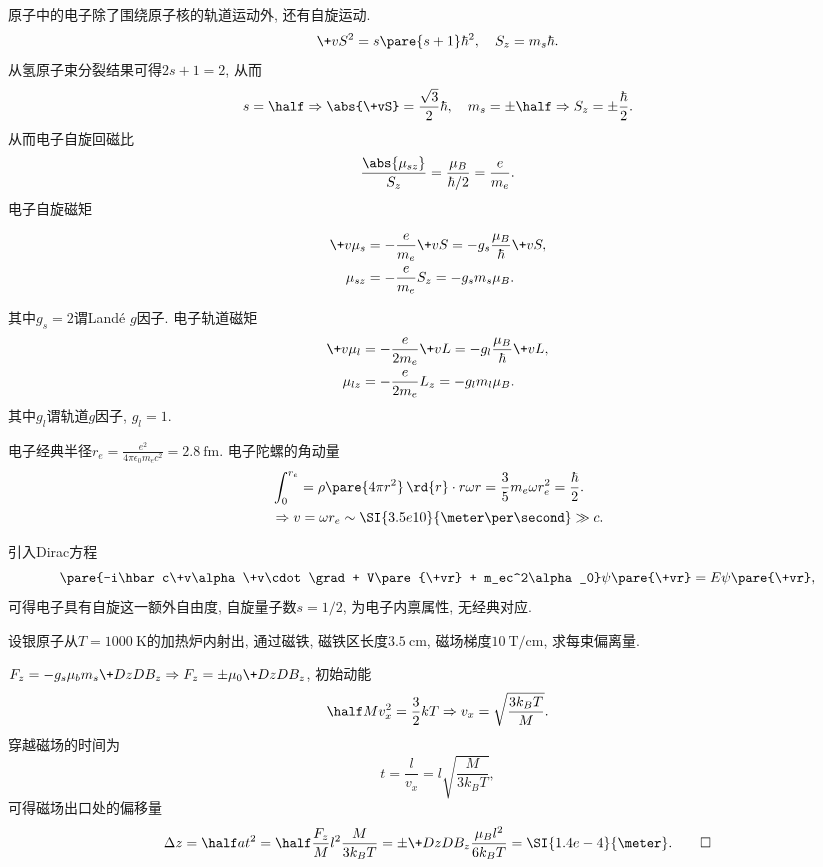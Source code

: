 \documentclass[hidelinks]{ctexart}
\begin{document}
原子中的电子除了围绕原子核的轨道运动外, 还有自旋运动.
\[ \+vS^2 = s\pare{s+1}\hbar^2,\quad S_z = m_s \hbar. \]
从氢原子束分裂结果可得$2s+1 = 2$, 从而
\[ s = \half \Rightarrow \abs{\+vS} = \frac{\sqrt{3}}{2}\hbar,\quad m_s = \pm \half \Rightarrow S_z = \pm \frac{\hbar}{2}. \]
从而电子自旋回磁比
\[ \frac{\abs{\mu_{sz}}}{S_z} = \frac{\mu_B}{\hbar/2} = \frac{e}{m_e}. \]
电子自旋磁矩
\begin{resume}
    \vspace{-\baselineskip}
\begin{align*}
    \+v\mu_s &= -\frac{e}{m_e}\+vS = -g_s\frac{\mu_B}{\hbar}\+vS,\\
    \mu_{sz} &= -\frac{e}{m_e}S_z = -g_s m_s \mu_B.
\end{align*}
\end{resume}
其中$g_s = 2$谓Land\'e $g$因子. 电子轨道磁矩
\begin{align*}
    \+v\mu_l &= -\frac{e}{2m_e}\+vL = -g_l \frac{\mu_B}{\hbar}\+vL, \\
    \mu_{lz} &= -\frac{e}{2m_e}L_z = -g_lm_l\mu_B.
\end{align*}
其中$g_l$谓轨道$g$因子, $g_l = 1$.

\begin{ex}
    电子经典半径$\displaystyle r_e = \frac{e^2}{4\pi \epsilon_0 m_e c^2} = \SI{2.8}{\femto\meter}$. 电子陀螺的角动量
    \begin{align*}
        & \int_0^{r_e} = \rho\pare{4\pi r^2}\,\rd{r}\cdot r\omega r = \frac{3}{5}m_e \omega r_e^2 = \frac{\hbar}{2}. \\
        & \Rightarrow v = \omega r_e \sim \SI{3.5e10}{\meter\per\second} \gg c.
    \end{align*}
\end{ex}

引入Dirac方程
\[ \pare{-i\hbar c\+v\alpha\+v\cdot\grad + V\pare{\+vr} + m_ec^2\alpha_0}\psi\pare{\+vr} = E\psi\pare{\+vr}, \]
可得电子具有自旋这一额外自由度, 自旋量子数$s=1/2$, 为电子内禀属性, 无经典对应.

\begin{sample}
    \begin{ex}
        设银原子从$T = \SI{1000}{\kelvin}$的加热炉内射出, 通过磁铁, 磁铁区长度$\SI{3.5}{\centi\meter}$, 磁场梯度$\SI{10}{\tesla\per\centi\meter}$, 求每束偏离量.
    \end{ex}
    \begin{solution}
        $\displaystyle F_z = -g_s \mu_b m_s \+DzD{B_z} \Rightarrow F_z = \pm \mu_0 \+DzD{B_z}$, 初始动能
        \[ \half Mv_x^2 = \frac{3}{2}kT \Rightarrow v_x = \sqrt{\frac{3k_BT}{M}}. \]
        穿越磁场的时间为
        \[ t = \frac{l}{v_x} = l\sqrt{\frac{M}{3k_BT}}, \]
        可得磁场出口处的偏移量
        \[ \Delta z = \half at^2 = \half \frac{F_z}{M}l^2 \frac{M}{3k_BT} = \pm \+DzD{B_z}\frac{\mu_B l^2}{6k_BT} = \SI{1.4e-4}{\meter}. \qedhere \]
    \end{solution}
\end{sample}
\end{document}
